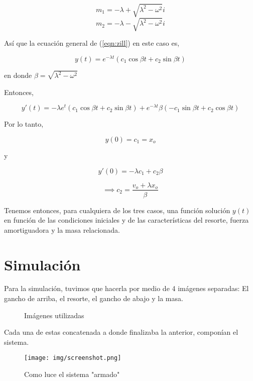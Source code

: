 \documentclass[11pt]{amsart}
\begin{document}
\[ m_1 = -\lambda + \sqrt{\lambda^2-\omega^2}  i\]
\[ m_2 = -\lambda - \sqrt{\lambda^2-\omega^2} i \]

As\'{i} que la ecuaci\'{o}n general de (\ref{eqn:zill}) en este caso es,

\[ y(t) = e^{-\lambda t}(c_1\cos{\beta t} + c_2\sin{\beta t} )\]

en donde $\beta = \sqrt{\lambda^2 - \omega^2}$ 

Entonces,

\[ y'(t) = -\lambda e^t (c_1\cos{\beta t} + c_2\sin{\beta t}) + e^{-\lambda t} \beta(-c_1 \sin{\beta t} + c_2 \cos{\beta t})\]

Por lo tanto,

\[ y(0) = c_1 = x_o\]

y

\[ y'(0) = -\lambda c_1 + c_2\beta \]

\[ \implies c_2  = \frac{v_o+\lambda x_o}{\beta}\]

Tenemos entonces, para cualquiera de los tres casos, una funci\'{o}n soluci\'{o}n $y(t)$ en funci\'{o}n de las condiciones iniciales y de las caracter\'{i}sticas del resorte, fuerza amortiguadora y la masa relacionada. \\

\vspace{1cm}
\section {Simulaci\'{o}n}

Para la simulaci\'{o}n, tuvimos que hacerla por medio de 4 im\'{a}genes separadas: El gancho de arriba, el resorte, el gancho de abajo y la masa.
\vspace*{-0.75in}
\begin{figure}[htp]
  \begin{center}
  \end{center}
  \caption{Im\'{a}genes utilizadas}
\end{figure}

Cada una de estas concatenada a donde finalizaba la anterior, compon\'{i}an el sistema.

\vspace*{-0.025in}
\begin{figure}[htp]
\texttt{[image: img/screenshot.png]}
\caption{Como luce el sistema "armado"}
\end{figure}
\end{document}
